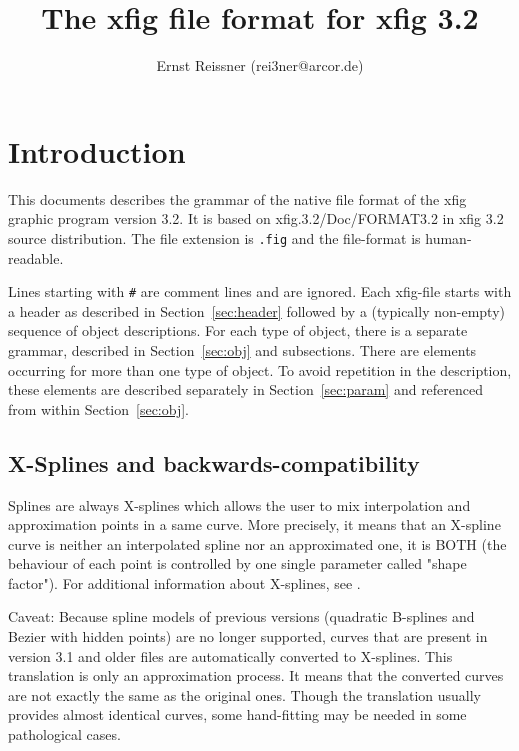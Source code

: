 \documentclass[10pt, a4paper]{article}
\title{The xfig file format for xfig 3.2 }
\author{Ernst Reissner (rei3ner@arcor.de)}
\begin{document}
\maketitle
\tableofcontents

\section{Introduction}

This documents describes the grammar 
of the native file format of the xfig graphic program version 3.2. 
It is based on xfig.3.2/Doc/FORMAT3.2 in xfig 3.2 source distribution. 
The file extension is {\tt.fig} and the file-format is human-readable. 

Lines starting with {\tt\#} are comment lines and are ignored. 
Each xfig-file starts with a header as described in Section~\ref{sec:header} 
followed by a (typically non-empty) sequence of object descriptions. 
For each type of object, there is a separate grammar, 
described in Section~\ref{sec:obj} and subsections. 
There are elements occurring for more than one type of object. 
To avoid repetition in the description, 
these elements are described separately in Section~\ref{sec:param} 
and referenced from within Section~\ref{sec:obj}. 


\subsection{X-Splines and backwards-compatibility}

Splines are always X-splines 
which allows the user to mix interpolation and approximation
points in a same curve. 
More precisely, it means that an X-spline curve 
is neither an interpolated spline nor an approximated one, 
it is BOTH (the behaviour of each point 
is controlled by one single parameter called "shape factor"). 
For additional information about X-splines, see \cite{XSpline}. 

Caveat: Because spline models of previous versions (quadratic B-splines
and Bezier with hidden points) are no longer supported, curves that are
present in version 3.1 and older files are automatically converted to
X-splines. This translation is only an approximation process. It means
that the converted curves are not exactly the same as the original ones.
Though the translation usually provides almost identical curves, some
hand-fitting may be needed in some pathological cases. 
\end{document}
